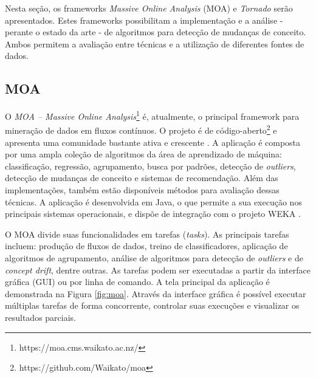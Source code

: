 \documentclass[qual, classic, a4paper]{ufbathesis}
\begin{document}
Nesta seção, os frameworks \textit{Massive Online Analysis} (MOA) e \textit{Tornado} serão apresentados.
Estes frameworks possibilitam a implementação e a análise - perante o estado da arte - de algoritmos para detecção de mudanças de conceito.
Ambos permitem a avaliação entre técnicas e a utilização de diferentes fontes de dados.

\subsection{MOA}

O \textit{MOA – Massive Online Analysis}\footnote{https://moa.cms.waikato.ac.nz/} é, atualmente, o principal framework para mineração de dados em fluxos contínuos.
O projeto é de código-aberto\footnote{https://github.com/Waikato/moa} e apresenta uma comunidade bastante ativa e crescente \cite{Bifet:2010:MMO:1756006.1859903}.
A aplicação é composta por uma ampla coleção de algoritmos da área de aprendizado de máquina: classificação, regressão, agrupamento, busca por padrões, detecção de \textit{outliers}, detecção de mudanças de conceito e sistemas de recomendação.
Além das implementações, também estão disponíveis métodos para avaliação dessas técnicas.
A aplicação é desenvolvida em Java, o que permite a sua execução nos principais sistemas operacionais, e dispõe de integração com o projeto WEKA \cite{Hall:2009:WDM:1656274.1656278}.

O MOA divide suas funcionalidades em tarefas (\textit{tasks}).
As principais tarefas incluem:
produção de fluxos de dados,
treino de classificadores,
aplicação de algoritmos de agrupamento,
análise de algoritmos para detecção de \textit{outliers} e de \textit{concept drift}, dentre outras.
As tarefas podem ser executadas a partir da interface gráfica (GUI) ou por linha de comando.
A tela principal da aplicação é demonstrada na Figura \ref{fig:moa}.
Através da interface gráfica é possível executar múltiplas tarefas de forma concorrente, 
controlar suas execuções e visualizar os resultados parciais.
\end{document}
